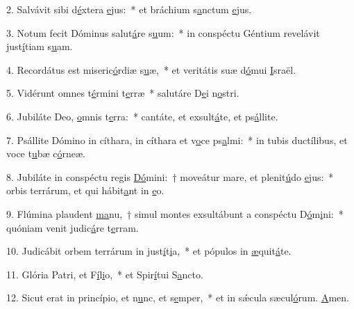 2. Salvávit sibi d\uline{é}xtera \uline{e}jus:~* et bráchium s\uline{a}nctum \uline{e}jus.\par 
3. Notum fecit Dóminus salut\uline{á}re s\uline{u}um:~* in conspéctu Géntium revelávit just\uline{í}tiam s\uline{u}am.\par 
4. Recordátus est miseric\uline{ó}rdiæ s\uline{u}æ,~* et veritátis suæ d\uline{ó}mui \uline{I}sraël.\par 
5. Vidérunt omnes t\uline{é}rmini t\uline{e}rræ~* salutáre D\uline{e}i n\uline{o}stri.\par 
6. Jubiláte Deo, \uline{o}mnis t\uline{e}rra:~* cantáte, et exsult\uline{á}te, et ps\uline{á}llite.\par 
7. Psállite Dómino in cíthara, in cíthara et v\uline{o}ce ps\uline{a}lmi:~* in tubis ductílibus, et voce t\uline{u}bæ c\uline{ó}rneæ.\par 
8. Jubiláte in conspéctu regis \uline{Dó}mini:~† moveátur mare, et plenit\uline{ú}do \uline{e}jus:~* orbis terrárum, et qui hábit\uline{a}nt in \uline{e}o.\par 
9. Flúmina plaudent \uline{ma}nu,~† simul montes exsultábunt a conspéctu D\uline{ó}m\uline{i}ni:~* quóniam venit judic\uline{á}re t\uline{e}rram.\par 
10. Judicábit orbem terrárum in just\uline{í}t\uline{i}a,~* et pópulos in \uline{æ}quit\uline{á}te.\par 
11. Glória Patri, et F\uline{í}l\uline{i}o,~* et Spir\uline{í}tui S\uline{a}ncto.\par 
12. Sicut erat in princípio, et n\uline{u}nc, et s\uline{e}mper,~* et in sǽcula sæcul\uline{ó}rum. \uline{A}men.\par 

